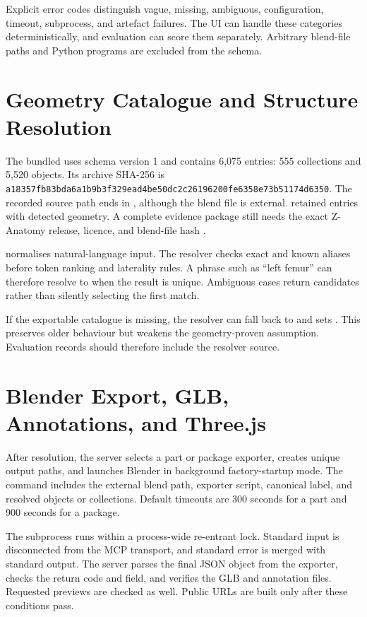 Explicit error codes distinguish vague, missing, ambiguous, configuration, timeout, subprocess, and artefact failures. The UI can handle these categories deterministically, and evaluation can score them separately. Arbitrary blend-file paths and Python programs are excluded from the schema.

\section{Geometry Catalogue and Structure Resolution}
\label{sec:catalog-resolution}

The bundled  uses schema version 1 and contains 6,075 entries: 555 collections and 5,520 objects. Its archive SHA-256 is \nolinkurl{a18357fb83bda6a1b9b3f329ead4be50dc2c26196200fe6358e73b51174d6350}. The recorded source path ends in , although the blend file is external.  retained entries with detected geometry. A complete evidence package still needs the exact Z-Anatomy release, licence, and blend-file hash \parencite{zanatomy}.

 normalises natural-language input. The resolver checks exact and known aliases before token ranking and laterality rules. A phrase such as ``left femur'' can therefore resolve to  when the result is unique. Ambiguous cases return candidates rather than silently selecting the first match.

If the exportable catalogue is missing, the resolver can fall back to  and sets . This preserves older behaviour but weakens the geometry-proven assumption. Evaluation records should therefore include the resolver source.

\section{Blender Export, GLB, Annotations, and Three.js}
\label{sec:blender-viewer}

After resolution, the server selects a part or package exporter, creates unique output paths, and launches Blender in background factory-startup mode. The command includes the external blend path, exporter script, canonical label, and resolved objects or collections. Default timeouts are 300 seconds for a part and 900 seconds for a package.

The subprocess runs within a process-wide re-entrant lock. Standard input is disconnected from the MCP transport, and standard error is merged with standard output. The server parses the final JSON object from the exporter, checks the return code and  field, and verifies the GLB and annotation files. Requested previews are checked as well. Public URLs are built only after these conditions pass.

